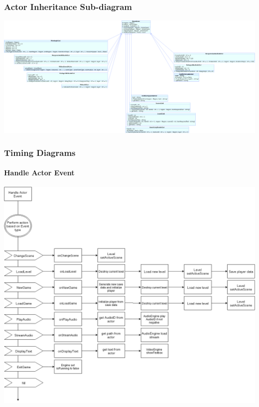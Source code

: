 \documentclass{article}
\begin{document}
		\subsubsection{Actor Inheritance Sub-diagram}
			\begin{center}
				\includegraphics[scale=0.27]{Actors}
			\end{center}
		\subsubsection{Timing Diagrams}
			\paragraph{Handle Actor Event}
				\begin{center}
					\includegraphics[scale=0.3]{handle-actor-event}
				\end{center}
\end{document}
